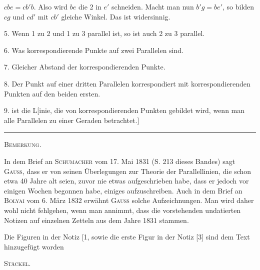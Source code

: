 $cbe = cb'b$. Also wird $be$ die 2 in $e'$ schneiden. Macht man nun $b'g = be'$, so bilden $cg$ und $cd'$ mit $cb'$ gleiche Winkel. Das ist widersinnig.

5. Wenn 1 zu 2 und 1 zu 3 parallel ist, so ist auch 2 zu 3 parallel.

6. Was korrespondierende Punkte auf zwei Parallelen sind.

7. Gleicher Abstand der korrespondierenden Punkte.

8. Der Punkt auf einer dritten Parallelen korrespondiert mit korrespondierenden Punkten auf den beiden ersten.

9.  ist die L[inie, die von korrespondierenden Punkten gebildet wird, wenn man alle Parallelen zu einer Geraden betrachtet.]

\bigskip
\begin{center}
\rule{2.5cm}{0.4pt}

\textsc{Bemerkung.}
\end{center}

In dem Brief an \textsc{Schumacher} vom 17. Mai 1831 (S. 213 dieses Bandes) sagt \textsc{Gauss}, dass er von seinen Überlegungen zur Theorie der Parallellinien, die schon etwa 40 Jahre alt seien, zuvor nie etwas aufgeschrieben habe, dass er jedoch vor einigen Wochen begonnen habe, einiges aufzuschreiben. Auch in dem Brief an \textsc{Bolyai} vom 6. März 1832 erwähnt \textsc{Gauss} solche Aufzeichnungen. Man wird daher wohl nicht fehlgehen, wenn man annimmt, dass die vorstehenden undatierten Notizen auf einzelnen Zetteln aus dem Jahre 1831 stammen.

Die Figuren in der Notiz [1, sowie die erste Figur in der Notiz [3] sind dem Text hinzugefügt worden

\hfill \textsc{Stäckel}.

